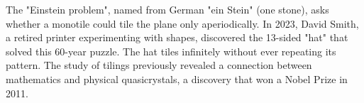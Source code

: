 The "Einstein problem", named from German "ein Stein" (one stone), asks whether a monotile could tile the plane only aperiodically. In 2023, David Smith, a retired printer experimenting with shapes, discovered the 13-sided "hat" that solved this 60-year puzzle. The hat tiles infinitely without ever repeating its pattern. The study of tilings previously revealed a connection between mathematics and physical quasicrystals, a discovery that won a Nobel Prize in 2011.
